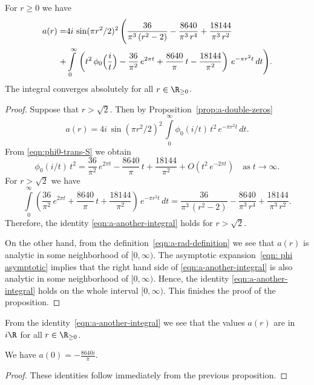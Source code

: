 \begin{proposition}\label{prop:a-another-integral}\leanok
For $r\geq0$ we have
\begin{align}\label{eqn:a-another-integral}a(r)=&4i\,\sin(\pi r^2/2)^2\,\Bigg(\frac{36}{\pi^3\,(r^2-2)}-\frac{8640}{\pi^3\,r^4}+\frac{18144}{\pi^3\,r^2}\\ +&\int\limits_0^\infty\,\left(t^2\,\phi_0\Big(\frac{i}{t}\Big)-\frac{36}{\pi^2}\,e^{2\pi t}+\frac{8640}{\pi}\,t-\frac{18144}{\pi^2}\right)\,e^{-\pi r^2 t}\,dt \Bigg) .\notag\end{align}
The integral converges absolutely for all $r\in\R_{\geq 0}$.
\end{proposition}
\begin{proof}\leanok
Suppose that $r>\sqrt{2}$. Then by Proposition~\ref{prop:a-double-zeros}
$$a(r)=4i\,\sin(\pi r^2/2)^2\,\int\limits_{0}^{\infty}\phi_0(i/t)\,t^2\,e^{-\pi r^2 t}\,dt. $$
From \eqref{eqn:phi0-trans-S} we obtain
\begin{equation}\label{eqn: phi asymptotic}
\phi_0(i/t)\,t^2=\frac{36}{\pi^2}\,e^{2 \pi t}-\frac{8640}{\pi}\,t+\frac{18144}{\pi^2}+O(t^2\,e^{-2\pi t})\quad\mbox{as}\;t\to\infty.
\end{equation}
For $r>\sqrt{2}$ we have
\begin{equation}
\int\limits_0^\infty \left(\frac{36}{\pi^2}\,e^{2 \pi t}+\frac{8640}{\pi}\,t+\frac{18144}{\pi^2}\right)\,e^{-\pi r^2 t}\,dt
=\frac{36}{\pi^3\,(r^2-2)}-\frac{8640}{\pi^3\,r^4}+\frac{18144}{\pi^3\,r^2}.\end{equation}
Therefore, the identity \eqref{eqn:a-another-integral} holds for $r>\sqrt{2}$.

On the other hand, from the definition~\eqref{eqn:a-rad-definition} we see that $a(r)$ is analytic in some neighborhood of $[0,\infty)$. The asymptotic expansion~\eqref{eqn: phi asymptotic} implies that the right hand side of \eqref{eqn:a-another-integral} is also analytic in some neighborhood of $[0,\infty)$. Hence, the identity \eqref{eqn:a-another-integral} holds on the whole interval $[0,\infty)$. This finishes the proof of the proposition.
\end{proof}
From the identity~\eqref{eqn:a-another-integral} we see that the values $a(r)$ are in $i\R$ for all $r\in\R_{\geq0}$.
\begin{proposition}\label{prop:a0}\leanok
We have $a(0) = -\frac{8640 i}{\pi}$.
\end{proposition}
\begin{proof}\leanok
These identities follow immediately from the previous proposition.
\end{proof}

